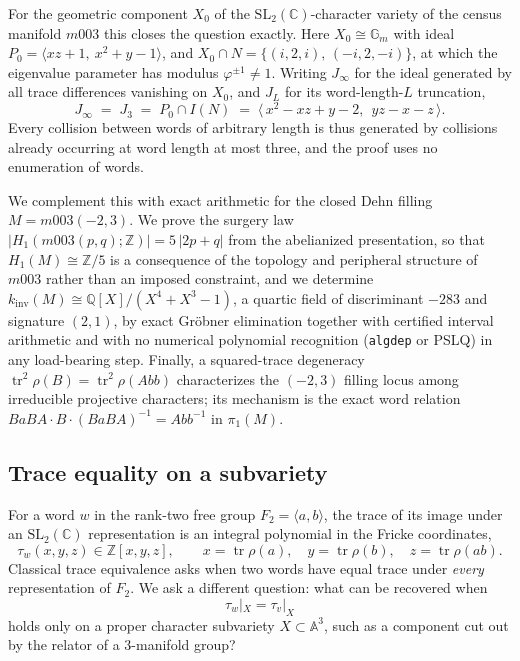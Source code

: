 \documentclass[11pt,a4paper]{article}
\theoremstyle{definition}
\theoremstyle{remark}
\newcommand{\tr}{\operatorname{tr}}
\newcommand{\kinv}{k_{\mathrm{inv}}}
\newcommand{\SLtwo}{\mathrm{SL}_2(\mathbb{C})}
\newcommand{\Zfive}{\mathbb{Z}/5}
\newcommand{\Q}{\mathbb{Q}}
\newcommand{\Z}{\mathbb{Z}}
\begin{document}
For the geometric component $X_0$ of the $\SLtwo$-character variety of
the census manifold $m003$ this closes the question exactly. Here
$X_0 \cong \mathbb{G}_m$ with ideal $P_0 = \langle xz+1,\ x^2+y-1\rangle$,
and $X_0 \cap N = \{(i,2,i),\,(-i,2,-i)\}$, at which the eigenvalue
parameter has modulus $\varphi^{\pm1} \neq 1$. Writing $J_\infty$ for the
ideal generated by all trace differences vanishing on $X_0$, and $J_L$ for
its word-length-$L$ truncation,
\begin{equation*}
J_\infty \;=\; J_3 \;=\; P_0 \cap I(N)
\;=\; \langle\, x^2 - xz + y - 2,\ \ yz - x - z \,\rangle .
\end{equation*}
Every collision between words of arbitrary length is thus generated by
collisions already occurring at word length at most three, and the proof
uses no enumeration of words.

We complement this with exact arithmetic for the closed Dehn filling
$M = m003(-2,3)$. We prove the surgery law
$|H_1(m003(p,q);\Z)| = 5\,|2p+q|$ from the abelianized presentation, so
that $H_1(M) \cong \Zfive$ is a consequence of the topology and peripheral
structure of $m003$ rather than an imposed constraint, and we determine
$\kinv(M) \cong \Q[X]/(X^4+X^3-1)$,
a quartic field of discriminant $-283$ and signature $(2,1)$, by exact
Gr\"obner elimination together with certified interval arithmetic and with
no numerical polynomial recognition (\texttt{algdep} or PSLQ) in any
load-bearing step. Finally, a squared-trace degeneracy
$\tr^2\rho(B) = \tr^2\rho(Abb)$ characterizes the $(-2,3)$ filling locus
among irreducible projective characters; its mechanism is the exact word
relation $BaBA \cdot B \cdot (BaBA)^{-1} = Abb^{-1}$ in $\pi_1(M)$.

\subsection{Trace equality on a subvariety}

For a word $w$ in the rank-two free group $F_2 = \langle a,b\rangle$, the
trace of its image under an $\SLtwo$ representation is an integral
polynomial in the Fricke coordinates,
\begin{equation}
\tau_w(x,y,z) \in \Z[x,y,z], \qquad
x = \tr\rho(a), \quad y = \tr\rho(b), \quad z = \tr\rho(ab).
\end{equation}
Classical trace equivalence asks when two words have equal trace under
\emph{every} representation of $F_2$. We ask a different question: what can
be recovered when
\begin{equation}
\tau_w|_X = \tau_v|_X
\end{equation}
holds only on a proper character subvariety $X \subset \mathbb{A}^3$, such
as a component cut out by the relator of a $3$-manifold group?
\end{document}
